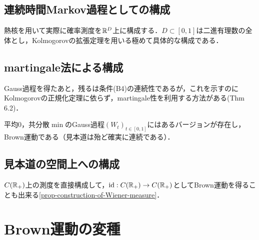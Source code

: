 \documentclass[uplatex,dvipdfmx]{jsreport}
\begin{document}
\subsection{連続時間Markov過程としての構成}

\begin{tcolorbox}[colframe=ForestGreen, colback=ForestGreen!10!white,breakable,colbacktitle=ForestGreen!40!white,coltitle=black,fonttitle=\bfseries\sffamily,
title=]
    熱核を用いて実際に確率測度を$\mathbb{R}^D$上に構成する．$D\subset[0,1]$は二進有理数の全体とし，Kolmogorovの拡張定理を用いる極めて具体的な構成である\cite{舟木}．
\end{tcolorbox}

\subsection{martingale法による構成}

\begin{tcolorbox}[colframe=ForestGreen, colback=ForestGreen!10!white,breakable,colbacktitle=ForestGreen!40!white,coltitle=black,fonttitle=\bfseries\sffamily,
title=]
    Gauss過程を得たあと，残るは条件(B4)の連続性であるが，これを示すのにKolmogorovの正規化定理に依らず，martingale性を利用する方法がある\cite{Bass}(Thm 6.2)．
\end{tcolorbox}


\begin{theorem}[martingaleによる正則化]
    平均$0$，共分散$\min$のGauss過程$(W_t)_{t\in[0,1]}$にはあるバージョンが存在し，Brown運動である（見本道は殆ど確実に連続である）．
\end{theorem}

\subsection{見本道の空間上への構成}

\begin{tcolorbox}[colframe=ForestGreen, colback=ForestGreen!10!white,breakable,colbacktitle=ForestGreen!40!white,coltitle=black,fonttitle=\bfseries\sffamily,
title=]
    $C(\mathbb{R}_+)$上の測度を直接構成して，$\mathrm{id}:C(\mathbb{R}_+)\to C(\mathbb{R}_+)$としてBrown運動を得ることも出来る\ref{prop-construction-of-Wiener-measure}．
\end{tcolorbox}

\section{Brown運動の変種}
\end{document}
